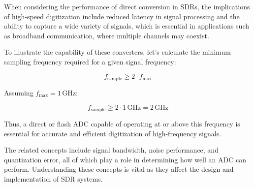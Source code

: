 When considering the performance of direct conversion in SDRs, the implications of high-speed digitization include reduced latency in signal processing and the ability to capture a wide variety of signals, which is essential in applications such as broadband communication, where multiple channels may coexist.

To illustrate the capability of these converters, let’s calculate the minimum sampling frequency required for a given signal frequency:

\[
f_{\text{sample}} \geq 2 \cdot f_{\text{max}}
\]

Assuming \(f_{\text{max}} = 1 \, \text{GHz}\):

\[
f_{\text{sample}} \geq 2 \cdot 1 \, \text{GHz} = 2 \, \text{GHz}
\]

Thus, a direct or flash ADC capable of operating at or above this frequency is essential for accurate and efficient digitization of high-frequency signals.

The related concepts include signal bandwidth, noise performance, and quantization error, all of which play a role in determining how well an ADC can perform. Understanding these concepts is vital as they affect the design and implementation of SDR systems.

